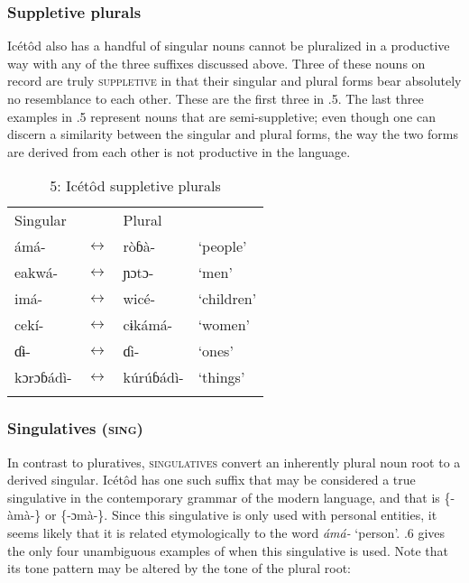 \subsubsection{Suppletive plurals}

Icétôd also has a handful of singular nouns cannot be pluralized in a productive way with any of the three suffixes discussed above. Three of these nouns on record are truly \textsc{suppletive} in that their singular and plural forms bear absolutely no resemblance to each other. These are the first three in .5. The last three examples in .5 represent nouns that are semi-suppletive; even though one can discern a similarity between the singular and plural forms, the way the two forms are derived from each other is not productive in the language.  


\begin{table}
\caption{5: Icétôd suppletive plurals}
\label{tab:4}


\begin{tabularx}{\textwidth}{XXXX}
\lsptoprule

Singular &  & Plural & \\
ámá- & $\leftrightarrow $ & ròɓà- & ‘people’\\
eakwá- & $\leftrightarrow $ & ɲɔtɔ- & ‘men’\\
imá- & $\leftrightarrow $ & wicé- & ‘children’\\
cekí- & $\leftrightarrow $ & cɨkámá- & ‘women’\\
ɗɨ{}- & $\leftrightarrow $ & ɗi- & ‘ones’\\
kɔrɔɓádì- & $\leftrightarrow $ & kúrúɓádì- & ‘things’\\
\lspbottomrule
\end{tabularx}
\end{table}

\subsubsection{Singulatives (\textsc{sing})}

In contrast to pluratives, \textsc{singulatives} convert an inherently plural noun root to a derived singular. Icétôd has one such suffix that may be considered a true singulative in the contemporary grammar of the modern language, and that is \{-àmà-\} or \{-ɔmà-\}. Since this singulative is only used with personal entities, it seems likely that it is related etymologically to the word \textit{ámá-} ‘person’. .6 gives the only four unambiguous examples of when this singulative is used. Note that its tone pattern may be altered by the tone of the plural root:


